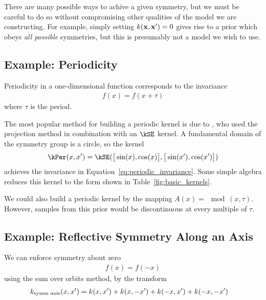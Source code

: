 There are many possible ways to achive a given symmetry, but we must be careful to do so without compromising other qualities of the model we are constructing.
For example, simply setting $k({\bf{x}}, {\bf{x}}') = 0$ gives rise to a \gp{} prior which obeys \emph{all possible} symmetries, but this is presumably not a model we wish to use.






\subsection{Example: Periodicity}

Periodicity in a one-dimensional function corresponds to the invariance
%
\begin{align}
f(x) = f( x + \tau)%
\label{eq:periodic_invariance}
\end{align}
%
where $\tau$ is the period.

The most popular method for building a periodic kernel is due to \citet{mackay1998introduction}, who used the projection method in combination with an $\kSE$ kernel.
A fundamental domain of the symmetry group is a circle, so the kernel
%
%
\begin{align}
\kPer(x, x') = \kSE( \big[ \sin(x), \cos(x) \big], \big[ \sin(x'), \cos(x') \big])
\end{align}
%
achieves the invariance in Equation~\eqref{eq:periodic_invariance}.
Some simple algebra reduces this kernel to the form shown in Table~\ref{fig:basic_kernels}.

We could also build a periodic kernel by the mapping $A(x) = \mod(x, \tau)$.
However, samples from this prior would be discontinuous at every multiple of $\tau$.

\subsection{Example: Reflective Symmetry Along an Axis}

We can enforce symmetry about zero
%
\begin{align}
f(x) = f( -x)
\end{align}
%
using the sum over orbits method, by the transform
%
\begin{align}
k_{\textnormal{symm axis}}(x, x') & = k(x, x') + k(x, -x') + k(-x, x') + k(-x, -x')
\end{align}
%


